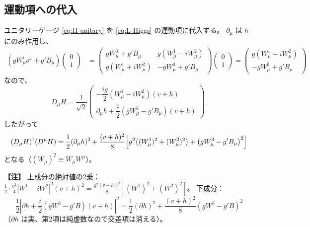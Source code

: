 \documentclass[uplatex,dvipdfmx,a4paper,11pt,openany]{jsbook}
\newenvironment{note}{\vspace{1ex}\par\footnotesize\noindent\textbf{【注】}}{\par\vspace{1ex}}
\numberwithin{equation}{chapter}
\theoremstyle{definition}
\theoremstyle{plain}
\theoremstyle{remark}
\begin{document}
\subsection{運動項への代入}
ユニタリーゲージ \eqref{eq:H-unitary} を \eqref{eq:L-Higgs} の運動項に代入する。
$\partial_\mu$ は $h$ にのみ作用し、
\begin{align}
\left(gW^i_\mu\sigma^i+g'B_\mu\right)\begin{pmatrix}0\\1\end{pmatrix}
&=\begin{pmatrix}gW^3_\mu+g'B_\mu & g(W^1_\mu-iW^2_\mu)\\ g(W^1_\mu+iW^2_\mu) & -gW^3_\mu+g'B_\mu\end{pmatrix}
\begin{pmatrix}0\\1\end{pmatrix}
=\begin{pmatrix}g(W^1_\mu-iW^2_\mu)\\ -gW^3_\mu+g'B_\mu\end{pmatrix}
\end{align}
なので、
\begin{equation}
D_\mu H=\frac{1}{\sqrt2}\begin{pmatrix}-\dfrac{ig}{2}(W^1_\mu-iW^2_\mu)(v+h)\\[2mm] \partial_\mu h+\dfrac{i}{2}(gW^3_\mu-g'B_\mu)(v+h)\end{pmatrix}.
\end{equation}
したがって
\begin{equation}
(D_\mu H)^\dagger(D^\mu H)
=\frac12(\partial_\mu h)^2
+\frac{(v+h)^2}{8}\Bigl[g^2\bigl((W^1_\mu)^2+(W^2_\mu)^2\bigr)+\bigl(gW^3_\mu-g'B_\mu\bigr)^2\Bigr]
\label{eq:DH-squared}
\end{equation}
となる（$(W_\mu)^2\equiv W_\mu W^\mu$）。
\begin{note}
上成分の絶対値の2乗：$\frac12\cdot\frac{g^2}{4}|W^1-iW^2|^2(v+h)^2=\frac{g^2(v+h)^2}{8}\left[(W^1)^2+(W^2)^2\right]$。
下成分：
\[
\frac12\left|\partial h+\frac i2(gW^3-g'B)(v+h)\right|^2=\frac12(\partial h)^2+\frac{(v+h)^2}{8}(gW^3-g'B)^2
\]
（$\partial h$ は実、第2項は純虚数なので交差項は消える）。
\end{note}
\end{document}
